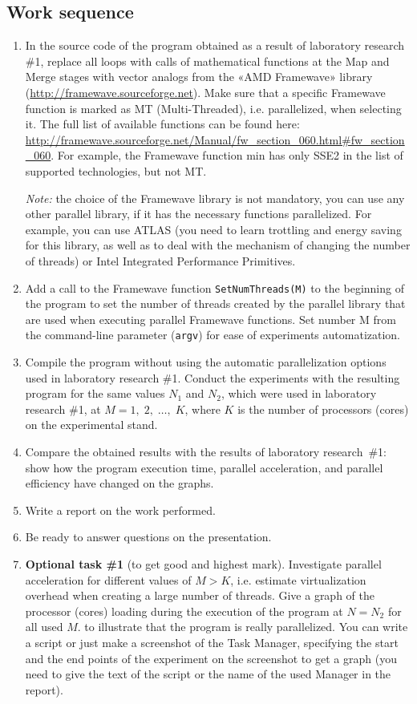 { %
	\subsection{Work sequence}
	\begin{enumerate}
		\item In the source code of the program obtained as a result of laboratory research \#1, replace all loops with calls of mathematical functions at the Map and Merge stages with vector analogs from the «AMD Framewave» library (\url{http://framewave.sourceforge.net}). Make sure that a specific Framewave function is marked as MT (Multi-Threaded), i.e. parallelized, when selecting it. The full list of available functions can be found here: \\{\small \url{http://framewave.sourceforge.net/Manual/fw_section_060.html#fw_section_060}}. For example, the Framewave function min has only SSE2 in the list of supported technologies, but not MT. 
			\par\textit{Note:} the choice of the Framewave library is not mandatory, you can use any other parallel library, if it has the necessary functions parallelized. For example, you can use ATLAS (you need to learn trottling and energy saving for this library, as well as to deal with the mechanism of changing the number of threads) or Intel Integrated Performance Primitives.
		\item Add a call to the Framewave function \texttt{SetNumThreads(M)} to the beginning of the program to set the number of threads created by the parallel library that are used when executing parallel Framewave functions. Set number M from the command-line parameter (\texttt{argv}) for ease of experiments automatization.
		\item Compile the program without using the automatic parallelization options used in laboratory research \#1. Conduct the experiments with the resulting program for the same values $N_1$ and $N_2$, which were used in laboratory research \#1, at $M=1,\;2,\;…,\;K$, where $K$ is the number of processors (cores) on the experimental stand.
		\item Compare the obtained results with the results of laboratory research~\#1: show how the program execution time, parallel acceleration, and parallel efficiency have changed on the graphs.
		\item Write a report on the work performed.
		\item Be ready to answer questions on the presentation.
		\item\textbf{Optional task \#1} (to get good and highest mark). Investigate parallel acceleration for different values of $M > K$, i.e. estimate virtualization overhead when creating a large number of threads. Give a graph of the processor (cores) loading during the execution of the program at $N=N_2$ for all used $M$. to illustrate that the program is really parallelized. You can write a script or just make a screenshot of the Task Manager, specifying the start and the end points of the experiment on the screenshot to get a graph (you need to give the text of the script or the name of the used Manager in the report).

\end{enumerate}}
